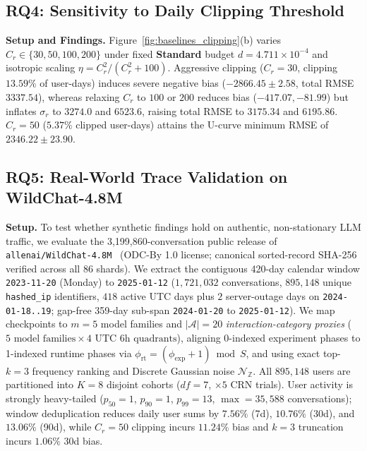 \documentclass[sigconf, nonacm]{acmart}
\begin{document}
\subsection{RQ4: Sensitivity to Daily Clipping Threshold}
\textbf{Setup and Findings.} Figure~\ref{fig:baselines_clipping}(b) varies $C_r \in \{30, 50, 100, 200\}$ under fixed \textbf{Standard} budget $d=4.711\times 10^{-4}$ and isotropic scaling $\eta = C_r^2/(C_r^2 + 100)$. Aggressive clipping ($C_r=30$, clipping $13.59\%$ of user-days) induces severe negative bias ($-2866.45 \pm 2.58$, total RMSE $3337.54$), whereas relaxing $C_r$ to $100$ or $200$ reduces bias ($-417.07, -81.99$) but inflates $\sigma_r$ to $3274.0$ and $6523.6$, raising total RMSE to $3175.34$ and $6195.86$. $C_r=50$ ($5.37\%$ clipped user-days) attains the U-curve minimum RMSE of $2346.22 \pm 23.90$.

\subsection{RQ5: Real-World Trace Validation on WildChat-4.8M}
\textbf{Setup.} To test whether synthetic findings hold on authentic, non-stationary LLM traffic, we evaluate the 3,199,860-conversation public release of \texttt{allenai/WildChat-4.8M}~\cite{zhao2024wildchat} (ODC-By 1.0 license; canonical sorted-record SHA-256 verified across all 86 shards). We extract the contiguous 420-day calendar window \texttt{2023-11-20} (Monday) to \texttt{2025-01-12} ($1{,}721{,}032$ conversations, $895{,}148$ unique \texttt{hashed\_ip} identifiers, $418$ active UTC days plus $2$ server-outage days on \texttt{2024-01-18..19}; gap-free 359-day sub-span \texttt{2024-01-20} to \texttt{2025-01-12}). We map checkpoints to $m=5$ model families and $|\mathcal{A}|=20$ \emph{interaction-category proxies} ($5\text{ model families} \times 4\text{ UTC 6h quadrants}$), aligning 0-indexed experiment phases to 1-indexed runtime phases via $\phi_{\mathrm{rt}} = (\phi_{\mathrm{exp}} + 1) \bmod S$, and using exact top-$k=3$ frequency ranking and Discrete Gaussian noise $\mathcal{N}_{\mathbb{Z}}$. All $895{,}148$ users are partitioned into $K=8$ disjoint cohorts ($df=7$, $\times 5$ CRN trials). User activity is strongly heavy-tailed ($p_{50}=1$, $p_{90}=1$, $p_{99}=13$, $\max=35{,}588$ conversations); window deduplication reduces daily user sums by $7.56\%$ (7d), $10.76\%$ (30d), and $13.06\%$ (90d), while $C_r=50$ clipping incurs $11.24\%$ bias and $k=3$ truncation incurs $1.06\%$ 30d bias.
\end{document}
